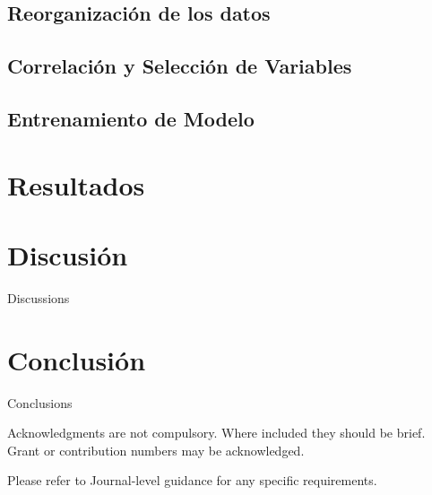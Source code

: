 \documentclass[sn-mathphys,Numbered]{sn-jnl}%
\theoremstyle{thmstyleone}%
\theoremstyle{thmstyletwo}%
\theoremstyle{thmstylethree}%
\begin{document}
\subsection{Reorganización de los datos}\label{subsec4}

\subsection{Correlación y Selección de Variables}\label{subsec5}


\subsection{Entrenamiento de Modelo}\label{subsec6}

\section{Resultados}\label{sec4}


\section{Discusión}\label{sec5}

Discussions

\section{Conclusión}\label{sec6}

Conclusions

\backmatter



Acknowledgments are not compulsory. Where included they should be brief. Grant or contribution numbers may be acknowledged.

Please refer to Journal-level guidance for any specific requirements.
\end{document}
